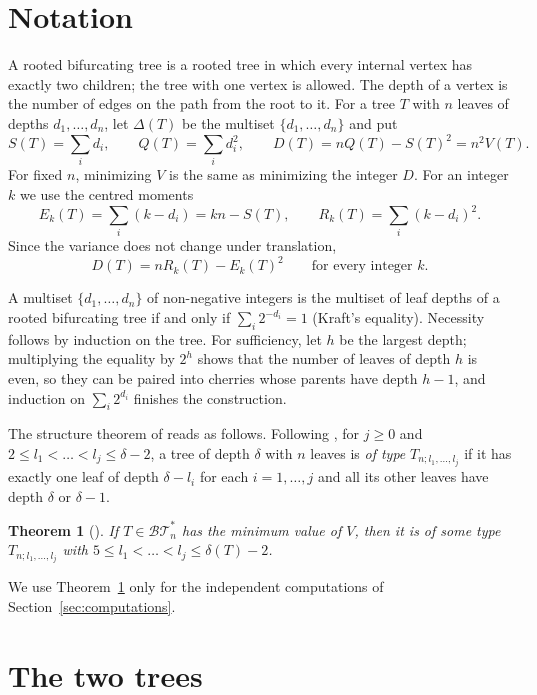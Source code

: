 \documentclass[11pt]{amsart}
\newtheorem{theorem}{Theorem}[section]
\theoremstyle{remark}
\newcommand{\BT}{\mathcal{BT}^{*}_{n}}
\begin{document}
\section{Notation}

A rooted bifurcating tree is a rooted tree in which every internal vertex has exactly two children; the tree with one vertex is allowed.
The depth of a vertex is the number of edges on the path from the root to it.
For a tree $T$ with $n$ leaves of depths $d_1,\dots,d_n$, let $\Delta(T)$ be the multiset $\{d_1,\dots,d_n\}$ and put
\[
S(T)=\sum_i d_i,\qquad Q(T)=\sum_i d_i^2,\qquad D(T)=nQ(T)-S(T)^2=n^2V(T).
\]
For fixed $n$, minimizing $V$ is the same as minimizing the integer $D$.
For an integer $k$ we use the centred moments
\[
E_k(T)=\sum_i(k-d_i)=kn-S(T),\qquad R_k(T)=\sum_i(k-d_i)^2 .
\]
Since the variance does not change under translation,
\begin{equation}\label{eq:centred}
D(T)=nR_k(T)-E_k(T)^2\qquad\text{for every integer }k.
\end{equation}

A multiset $\{d_1,\dots,d_n\}$ of non-negative integers is the multiset of leaf depths of a rooted bifurcating tree if and only if $\sum_i 2^{-d_i}=1$ (Kraft's equality).
Necessity follows by induction on the tree.
For sufficiency, let $h$ be the largest depth; multiplying the equality by $2^h$ shows that the number of leaves of depth $h$ is even, so they can be paired into cherries whose parents have depth $h-1$, and induction on $\sum_i 2^{d_i}$ finishes the construction.

The structure theorem of \cite{CMRR} reads as follows.
Following \cite[Definition~3]{CMRR}, for $j\ge0$ and $2\le l_1<\dots<l_j\le\delta-2$, a tree of depth $\delta$ with $n$ leaves is \emph{of type} $T_{n;l_1,\dots,l_j}$ if it has exactly one leaf of depth $\delta-l_i$ for each $i=1,\dots,j$ and all its other leaves have depth $\delta$ or $\delta-1$.

\begin{theorem}[{\cite[Theorem~2]{CMRR}}]\label{thm:types}
If $T\in\BT$ has the minimum value of $V$, then it is of some type $T_{n;l_1,\dots,l_j}$ with $5\le l_1<\dots<l_j\le\delta(T)-2$.
\end{theorem}

We use Theorem~\ref{thm:types} only for the independent computations of Section~\ref{sec:computations}.

\section{The two trees}\label{sec:trees}
\end{document}
